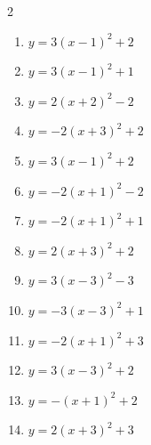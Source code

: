 \documentclass[b5paper,10pt]{ltjsarticle}
\begin{document}
\begin{multicols}{ 2 }
\begin{enumerate}
\vspace{170pt}\item $\displaystyle{} y= 3\left( x-1\right)^{2}+2$

\vspace{170pt}\item $\displaystyle{} y= 3\left( x-1\right)^{2}+1$

\vspace{170pt}\item $\displaystyle{} y= 2\left( x+2\right)^{2}-2$

\vspace{170pt}\item $\displaystyle{} y= -2\left( x+3\right)^{2}+2$

\vspace{170pt}\item $\displaystyle{} y= 3\left( x-1\right)^{2}+2$

\vspace{170pt}\item $\displaystyle{} y= -2\left( x+1\right)^{2}-2$

\vspace{170pt}\item $\displaystyle{} y= -2\left( x+1\right)^{2}+1$

\vspace{170pt}\item $\displaystyle{} y= 2\left( x+3\right)^{2}+2$

\vspace{170pt}\item $\displaystyle{} y= 3\left( x-3\right)^{2}-3$

\vspace{170pt}\item $\displaystyle{} y= -3\left( x-3\right)^{2}+1$

\vspace{170pt}\item $\displaystyle{} y= -2\left( x+1\right)^{2}+3$

\vspace{170pt}\item $\displaystyle{} y= 3\left( x-3\right)^{2}+2$

\vspace{170pt}\item $\displaystyle{} y= -\left( x+1\right)^{2}+2$

\vspace{170pt}\item $\displaystyle{} y= 2\left( x+3\right)^{2}+3$


\end{enumerate}
\end{multicols}
\end{document}
